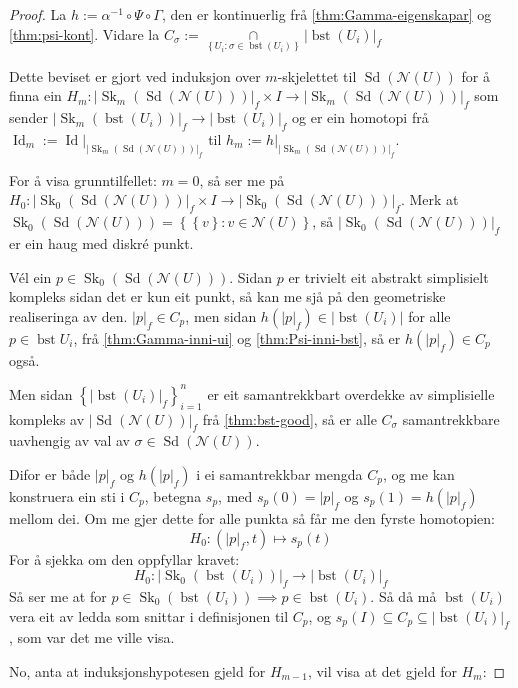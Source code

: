 \documentclass[a4paper, 12pt, norsk]{article}
\theoremstyle{plain}
\theoremstyle{definition}
\newcommand{\Nc}{\mathcal{N}}
\newcommand{\intersect}{ \mathop{\cap}\limits } %
\newcommand{\gr}[1]{ \lvert #1 \rvert } %
\newcommand{\set}[1]{ \left \{ #1 \right \} } %
\DeclareMathOperator{\Sd}{Sd}
\DeclareMathOperator{\bst}{bst}
\DeclareMathOperator{\Sk}{Sk}
\DeclareMathOperator{\Id}{Id}
\begin{document}
\begin{proof} %
	La \( h := \alpha^{-1} \circ \Psi \circ \Gamma \), den er kontinuerlig frå \autoref{thm:Gamma-eigenskapar} og \autoref{thm:psi-kont}. Vidare la \( C_\sigma := \intersect_{\set{ U_i : \sigma \in \bst(U_i) }} \gr{\bst(U_i)}_f \)

	Dette beviset er gjort ved induksjon over \( m \)-skjelettet til \( \Sd(\Nc(U)) \) for å finna ein \( H_m : \gr{\Sk_m(\Sd(\Nc(U)))}_f \times I \to \gr{\Sk_m(\Sd(\Nc(U)))}_f \) som sender \( \gr{\Sk_m(\bst(U_i))}_f \to \gr{\bst(U_i)}_f \) og er ein homotopi frå \( \Id_m := \Id|_{\gr{\Sk_m(\Sd(\Nc(U)))}_f} \) til \( h_m := h|_{\gr{\Sk_m(\Sd(\Nc(U)))}_f} \).

	For å visa grunntilfellet: \( m = 0 \), så ser me på \( H_0: \gr{\Sk_0(\Sd(\Nc(U)))}_f \times I \to \gr{\Sk_0(\Sd(\Nc(U)))}_f \). Merk at \( \Sk_0(\Sd(\Nc(U))) = \set{\set{v} : v \in \Nc(U)} \), så \( \gr{\Sk_0(\Sd(\Nc(U)))}_f \) er ein haug med diskré punkt.

	Vél ein \( p \in \Sk_0(\Sd(\Nc(U))) \). Sidan \( p \) er trivielt eit abstrakt simplisielt kompleks sidan det er kun eit punkt, så kan me sjå på den geometriske realiseringa av den. \( \gr{p}_f \in C_p \), men sidan \( h(\gr{p}_f) \in \gr{\bst(U_i)} \) for alle \( p \in \bst{U_i} \), frå \autoref{thm:Gamma-inni-ui} og \autoref{thm:Psi-inni-bst}, så er \( h(\gr{p}_f) \in C_p \) også.

	Men sidan \( \set{\gr{\bst(U_i)}_f}_{i = 1}^{n} \) er eit samantrekkbart overdekke av simplisielle kompleks av \( \gr{\Sd(\Nc(U))}_f \) frå \autoref{thm:bst-good}, så er alle \( C_\sigma \) samantrekkbare uavhengig av val av \( \sigma \in \Sd(\Nc(U)) \).

	Difor er både \( \gr{p}_f \) og \( h(\gr{p}_f) \) i ei samantrekkbar mengda \( C_p \), og me kan konstruera ein sti i \( C_p \), betegna \( s_p \), med \( s_p(0) = \gr{p}_f \) og \( s_p(1) = h(\gr{p}_f) \) mellom dei. Om me gjer dette for alle punkta så får me den fyrste homotopien:
	\[
		H_0 : (\gr{p}_f, t) \mapsto s_p(t)
	\]
	For å sjekka om den oppfyllar kravet:
	\[
		H_0: \gr{\Sk_0(\bst(U_i))}_f \to \gr{\bst(U_i)}_f
	\]
	Så ser me at for \( p \in \Sk_0(\bst(U_i)) \implies p \in \bst(U_i) \). Så då må \( \bst(U_i) \) vera eit av ledda som snittar i definisjonen til \( C_p \), og \( s_p(I) \subseteq C_p \subseteq \gr{\bst(U_i)}_f \), som var det me ville visa.

	No, anta at induksjonshypotesen gjeld for \( H_{m-1} \), vil visa at det gjeld for \( H_m \):


\end{proof}
\end{document}
